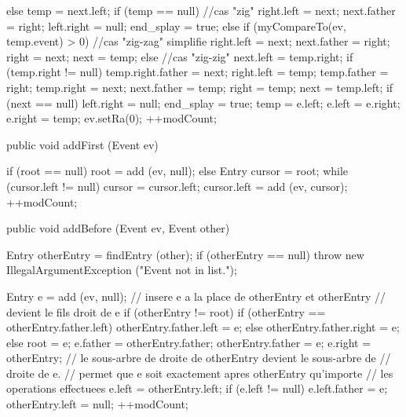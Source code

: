 \begin{hide}
\begin{code}
\begin{hide}
{{{{            } else {
               temp = next.left;
               if (temp == null) {
                  //cas "zig"
                  right.left = next;
                  next.father = right;
                  left.right = null;
                  end_splay = true;
               }
               else if (myCompareTo(ev, temp.event) > 0) {
                  //cas "zig-zag" simplifie
                  right.left = next;
                  next.father = right;
                  right = next;
                  next = temp;
               }
               else {
                  //cas "zig-zig"
                  next.left = temp.right;
                  if (temp.right != null)
                     temp.right.father = next;
                  right.left = temp;
                  temp.father = right;
                  temp.right = next;
                  next.father = temp;
                  right = temp;
                  next = temp.left;
                  if (next == null) {
                     left.right = null;
                     end_splay = true;
                  }
               }
            }
         }
         temp = e.left;
         e.left = e.right;
         e.right = temp;
      }
      ev.setRa(0);
      ++modCount;
   }\end{hide}

   public void addFirst (Event ev)\begin{hide} {
      if (root == null)
         root = add (ev, null);
      else {
         Entry cursor = root;
         while (cursor.left != null)
            cursor = cursor.left;
         cursor.left = add (ev, cursor);
      }
      ++modCount;
   }\end{hide}

   public void addBefore (Event ev, Event other)\begin{hide} {
      Entry otherEntry = findEntry (other);
      if (otherEntry == null)
         throw new IllegalArgumentException ("Event not in list.");

      Entry e = add (ev, null);
      // insere e a la place de otherEntry et otherEntry
      // devient le fils droit de e
      if (otherEntry != root) {
         if (otherEntry == otherEntry.father.left)
            otherEntry.father.left = e;
         else
            otherEntry.father.right = e;
      }
      else
         root = e;
      e.father = otherEntry.father;
      otherEntry.father = e;
      e.right = otherEntry;
      // le sous-arbre de droite de otherEntry devient le sous-arbre de
      // droite de e.
      // permet que e soit exactement apres otherEntry qu'importe
      // les operations effectuees
      e.left = otherEntry.left;
      if (e.left != null)
         e.left.father = e;
      otherEntry.left = null;
      ++modCount;
   }\end{hide}


\end{code}
\end{hide}
